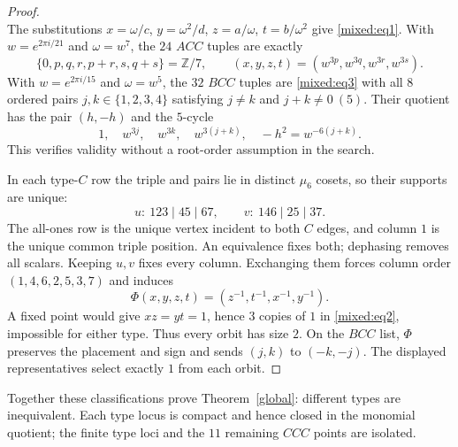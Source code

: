 \documentclass[11pt,a4paper]{article}
\theoremstyle{plain}
\theoremstyle{definition}
\numberwithin{equation}{section}
\begin{document}
\begin{proof}
$$$$
The substitutions $x=\omega/c$, $y=\omega^2/d$, $z=a/\omega$, $t=b/\omega^2$ give \eqref{mixed:eq1}. With $w=e^{2\pi i/21}$ and $\omega=w^7$, the $24$ $ACC$ tuples are exactly
\begin{equation}
 \{0,p,q,r,p+r,s,q+s\}=\mathbb{Z}/7,
 \qquad (x,y,z,t)=(w^{3p},w^{3q},w^{3r},w^{3s}). \label{mixed:eq7}
\end{equation}
With $w=e^{2\pi i/15}$ and $\omega=w^5$, the $32$ $BCC$ tuples are \eqref{mixed:eq3} with all $8$ ordered pairs $j,k\in\{1,2,3,4\}$ satisfying $j\ne k$ and $j+k\ne0\ (5)$. Their quotient has the pair $(h,-h)$ and the $5$-cycle
$$
 1,\quad w^{3j},\quad w^{3k},\quad w^{3(j+k)},\quad
 -h^2=w^{-6(j+k)}.
$$
This verifies validity without a root-order assumption in the search.

\label{mixed:s:equivalence}\label{mixed:equivalence}
In each type-$C$ row the triple and pairs lie in distinct $\mu_6$ cosets, so their supports are unique:
\begin{equation}
 u:\ 123\mid45\mid67,
 \qquad v:\ 146\mid25\mid37. \label{mixed:eq8}
\end{equation}
The all-ones row is the unique vertex incident to both $C$ edges, and column $1$ is the unique common triple position. An equivalence fixes both; dephasing removes all scalars. Keeping $u,v$ fixes every column. Exchanging them forces column order $(1,4,6,2,5,3,7)$ and induces
\begin{equation}
 \Phi(x,y,z,t)=(z^{-1},t^{-1},x^{-1},y^{-1}). \label{mixed:eq4}
\end{equation}
A fixed point would give $xz=yt=1$, hence $3$ copies of $1$ in \eqref{mixed:eq2}, impossible for either type. Thus every orbit has size $2$. On the $BCC$ list, $\Phi$ preserves the placement and sign and sends $(j,k)$ to $(-k,-j)$. The displayed representatives select exactly $1$ from each orbit.
\end{proof}
Together these classifications prove Theorem~\ref{global}: different types are inequivalent. Each type locus is compact and hence closed in the monomial quotient; the finite type loci and the $11$ remaining $CCC$ points are isolated.
\end{document}
